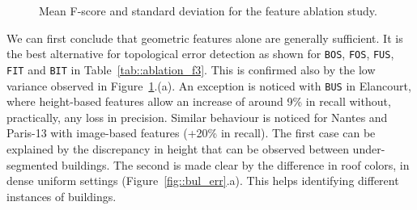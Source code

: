             \begin{figure}[h]
                \centering
                
                \caption{\label{fig::f_score_ablation_f3} Mean F-score and standard deviation for the feature ablation study.}
            \end{figure}

            We can first conclude that geometric features alone are generally sufficient.
            It is the best alternative for topological error detection as shown for \texttt{BOS}, \texttt{FOS}, \texttt{FUS}, \texttt{FIT} and \texttt{BIT} in Table~\ref{tab::ablation_f3}.
            This is confirmed also by the low variance observed in Figure~\ref{fig::f_score_ablation_f3}.(a).
            An exception is noticed with \texttt{BUS} in Elancourt, where height-based features allow an increase of around 9\% in recall without, practically, any loss in precision.
            Similar behaviour is noticed for Nantes and Paris-13 with image-based features (+20\% in recall).
            The first case can be explained by the discrepancy in height that can be observed between under-segmented buildings.
            The second is made clear by the difference in roof colors, in dense uniform settings (Figure~\ref{fig::bul_err}.a).
            This helps identifying different instances of buildings.

